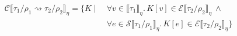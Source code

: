\documentclass[a4paper, 12pt]{article}
\newcommand{\modulus}[1]{\left| #1 \right|}
\newcommand{\abs}{\modulus}
\newcommand{\+}{\enspace}
\begin{document}
\iffalse
\begin{align*}
	\abs{τ_1 →_ρ τ_2} &= \abs{τ_1} + \abs{ρ} + \abs{τ_2}
	\abs{∀α::κ.\,τ} &= 1 + \abs{τ} \\
	\abs{α} &= 1 \\
\end{align*}
\fi
\begin{align*}
	\mathcal{C}⟦τ_1/ρ_1 \rightsquigarrow τ_2/ρ_2⟧_η =
	\{K \mid\ & ∀v∈⟦τ_1⟧_η.\,K[v]∈\mathcal{E}⟦τ_2/ρ_2⟧_η \ ∧ \\
			& ∀e∈\mathcal{S}⟦τ_1/ρ_1⟧_η.\, K[e]∈\mathcal{E}⟦τ_2/ρ_2⟧_η \}
\end{align*}
\end{document}
